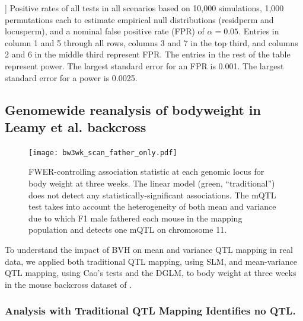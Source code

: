 \begin{table}
        ]
        {
            Positive rates of all tests in all scenarios based on 10,000 simulations, 1,000 permutations each to estimate empirical null distributions (residperm and locusperm), and a nominal false positive rate (FPR) of $\alpha = 0.05$.
            Entries in column 1 and 5 through all rows, columns 3 and 7 in the top third, and columns 2 and 6 in the middle third represent FPR.
            The entries in the rest of the table represent power.
            The largest standard error for an FPR is 0.001.
            The largest standard error for a power is 0.0025.
        }
        \label{tab:05}
    \end{table}


\subsection{Genomewide reanalysis of bodyweight in Leamy et al. backcross}

\begin{figure}
  \texttt{[image: bw3wk\_scan\_father\_only.pdf]}
  \caption[
    FWER-controlling association statistic at each genomic locus for body weight at three weeks.
  ]
  {
    FWER-controlling association statistic at each genomic locus for body weight at three weeks.
    The linear model (green, ``traditional'') does not detect any statistically-significant associations.
    The mQTL test takes into account the heterogeneity of both mean and variance due to which F1 male fathered each mouse in the mapping population and detects one mQTL on chromosome 11.
  }
  \label{fig:genome_scan_dglm}
\end{figure}

To understand the impact of BVH on mean and variance QTL mapping in real data, we applied both traditional QTL mapping, using SLM, and mean-variance QTL mapping, using Cao's tests and the DGLM, to body weight at three weeks in the mouse backcross dataset of \citet{Leamy2000}.

\subsubsection{Analysis with Traditional QTL Mapping Identifies no QTL.}

